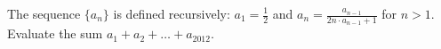 \problem
The sequence $\{a_n\}$ is defined recursively:
$a_1 = \frac{1}{2}$ and
$a_n = \frac{a_{n-1}}{2n \cdot a_{n-1} + 1}$ for $n > 1$.
Evaluate the sum $a_1 + a_2 + \ldots + a_{2012}$.
\solution
\endproblem
